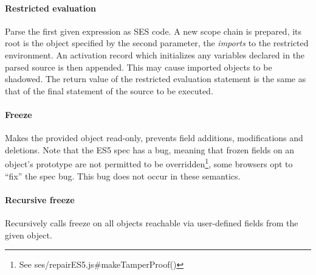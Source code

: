 \documentclass[a4paper]{article}
\begin{document}
\paragraph{Restricted evaluation} Parse the first given expression as SES code.
A new scope chain is prepared, its root is the
object specified by the second parameter, the \emph{imports} to the restricted
environment.
An activation record which initializes any variables declared in the parsed
source is then appended. This may cause imported objects to be shadowed.
The return value of the restricted evaluation statement is the same as that of
the final statement of the source to be executed.

\paragraph{Freeze} Makes the provided object read-only, prevents field additions,
modifications and deletions.
Note that the ES5 spec has a bug, meaning that frozen fields on an object's
prototype are not permitted to be overridden\footnote{See
ses/repairES5.js\#makeTamperProof()}, some browsers opt to ``fix'' the spec bug.
This bug does not occur in these semantics.

\paragraph{Recursive freeze} Recursively calls freeze on all objects reachable
via user-defined fields from the given object.
\end{document}
